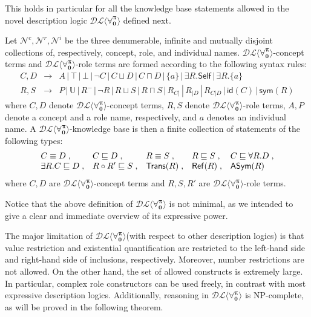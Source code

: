 \documentclass[a4paper,UKenglish]{lipics}
\newcommand{\Lang}{\ensuremath{\mathbf{\forall_{0}^{\pi}}}\xspace}
\newcommand{\dlLang}{\ensuremath{\mathcal{DL\langle}\Lang\mathcal{\rangle}}\xspace}
\newcommand{\selfrestriction}[1]{\exists #1.\mathsf{Self}}
\newcommand{\istransitive}[1]{\mathsf{Trans}(#1)}
\newcommand{\isreflexive}[1]{\mathsf{Ref}(#1)}
\newcommand{\isantisymmetric}[1]{\mathsf{ASym}(#1)}
\newcommand{\symmetricclosure}[1]{\mathsf{sym}(#1)}
\newcommand{\roleidentity}[1]{\mathsf{id}(#1)}
\newcommand{\universalrole}{\mathbb{U}}
\begin{document}
This holds in particular for all the knowledge base statements
allowed in the novel description logic \dlLang defined next.

\begin{definition}\label{DLLANG}
Let $\mathcal{N}^c, \mathcal{N}^r, \mathcal{N}^i$ be the three
denumerable, infinite and mutually disjoint collections of, respectively,
concept, role, and individual names.
\dlLang-concept terms and \dlLang-role terms are formed according to the
following syntax rules:
\[
 \begin{array}{rcl}
  C,D & \longrightarrow & 
  A \,|\, \top \,|\, \bot \,|\, \neg C \,|\, C \sqcup D \,|\, C \sqcap D \,|\, \{ a \} \,|\, \selfrestriction{R} \,|\, \exists R.\{a\}\\
%
  R,S & \longrightarrow & P \,|\, \universalrole \,|\, R^{-} \,|\, \neg R \,|\, R \sqcup S \,|\, R \sqcap S \,|\, R_{C|} \,|\,R_{|D} \,|\, R_{C|D} \,|\, \roleidentity{C} \,|\, \symmetricclosure{R}
 \end{array}
\]
where $C,D$ denote \dlLang-concept terms, $R,S$ denote \dlLang-role
terms, $A, P$ denote a concept and a role name, respectively, and $a$
denotes an individual name.  A \dlLang-knowledge base is then a finite
collection of statements of the following types:
\[
 \begin{array}{lllll}
 C \equiv D\;, & C \Issub D\;, & R \equiv S\;, &R \Issub S\;, & C \Issub \forall R.D\;, \\
 \exists R.C \Issub D\;, & R \circ R' \Issub S\;, & \istransitive{R}\;, & \isreflexive{R} \;, &\isantisymmetric{R}
\end{array}
\]
where $C,D$ are \dlLang-concept terms and $R,S,R'$ are \dlLang-role terms.
\end{definition}

Notice that the above definition of \dlLang is not minimal,
as we intended to give a clear and immediate overview of its
expressive power.

The major limitation of \dlLang (with respect to other description
logics) is that value restriction and existential quantification are
restricted to the left-hand side and right-hand side of inclusions,
respectively.  Moreover, number restrictions are not allowed.  On
the other hand, the set of allowed constructs is extremely large.  In
particular, complex role constructors can be used freely, in contrast
with most expressive description logics.  Additionally, reasoning in
\dlLang is \textsc{NP}-complete, as will be proved in the following
theorem.
\end{document}
